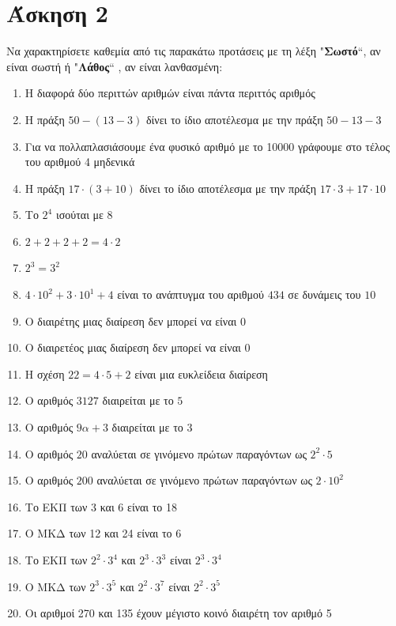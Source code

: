 \documentclass[a4paper,10pt]{report}
\begin{document}
\section*{Άσκηση 2  \hfill \small{}}
Να χαρακτηρίσετε καθεμία από τις παρακάτω προτάσεις με τη λέξη "\textbf{Σωστό}``, αν είναι σωστή ή  
"\textbf{Λάθος}`` , αν είναι λανθασμένη:
\begin{enumerate}[1)]
 \item Η διαφορά δύο περιττών αριθμών είναι πάντα περιττός αριθμός
 \item Η πράξη $50-(13-3)$ δίνει το ίδιο αποτέλεσμα με την πράξη $50-13-3$
 \item Για να πολλαπλασιάσουμε ένα φυσικό αριθμό με το 10000 γράφουμε στο τέλος του αριθμού 4 μηδενικά
 \item Η πράξη $17\cdot(3+10)$ δίνει το ίδιο αποτέλεσμα με την πράξη $17\cdot3+17\cdot10$
 \item Το $2^{4}$ ισούται με $8$
 \item $2+2+2+2=4\cdot2$
 \item $2^{3}=3^{2}$
 \item $4\cdot10^{2}+3\cdot10^{1}+4$ είναι το ανάπτυγμα του αριθμού $434$ σε δυνάμεις του $10$
 \item Ο διαιρέτης μιας διαίρεση δεν μπορεί να είναι 0
 \item Ο διαιρετέος μιας διαίρεση δεν μπορεί να είναι 0
 \item Η σχέση $22=4\cdot5+2$ είναι μια ευκλείδεια διαίρεση
 \item Ο αριθμός $3127$ διαιρείται με το $5$
 \item Ο αριθμός $9α+3$ διαιρείται με το $3$
 \item Ο αριθμός $20$ αναλύεται σε γινόμενο πρώτων παραγόντων ως $2^{2}\cdot 5$
 \item Ο αριθμός $200$ αναλύεται σε γινόμενο πρώτων παραγόντων ως $2\cdot 10^{2}$
 \item Το ΕΚΠ των 3 και 6 είναι το 18
 \item Ο ΜΚΔ των 12 και 24 είναι το 6
 \item Το ΕΚΠ των $2^{2}\cdot 3^{4}$ και $2^{3}\cdot 3^{3}$ είναι $2^{3}\cdot 3^{4}$
 \item O MKΔ των $2^{3}\cdot 3^{5}$ και $2^{2}\cdot 3^{7}$ είναι $2^{2}\cdot 3^{5}$
 \item Οι αριθμοί 270 και 135 έχουν μέγιστο κοινό διαιρέτη τον αριθμό 5
\end{enumerate}
\end{document}
